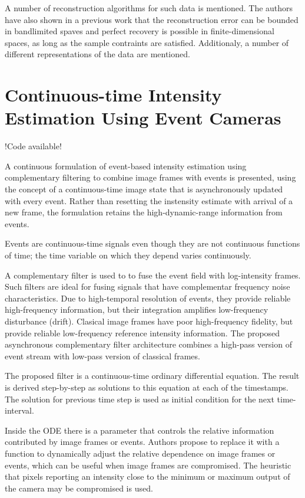\documentclass[10pt,a4paper]{article}
\begin{document}
A number of reconstruction algorithms for such data is mentioned.
The authors have also shown in a previous work that the reconstruction error can be bounded in bandlimited spaves and perfect recovery is possible in finite-dimensional spaces, as long as the sample contraints are satisfied.
Additionaly, a number of different representations of the data are mentioned.

\section{Continuous-time Intensity Estimation Using Event Cameras}
!Code available!

A continuous formulation of event-based intensity estimation using complementary filtering to combine image frames with events is presented, using the concept of a continuous-time image state that is asynchronously updated with every event.
Rather than resetting the instensity estimate with arrival of a new frame, the formulation retains the high-dynamic-range information from events.

Events are continuous-time signals even though they are not continuous functions of time; the time variable on which they depend varies continuously.

A complementary filter is used to to fuse the event field with log-intensity frames. 
Such filters are ideal for fusing signals that have complementar frequency noise characteristics.
Due to high-temporal resolution of events, they provide reliable high-frequency information, but their integration amplifies low-frequency disturbance (drift).
Clasical image frames have poor high-frequency fidelity, but provide reliable low-frequency reference intensity information.
The proposed asynchronous complementary filter architecture combines a high-pass version of event stream with low-pass version of classical frames.

The proposed filter is a continuous-time ordinary differential equation. The result is derived step-by-step as solutions to this equation at each of the timestamps. 
The solution for previous time step is used as initial condition for the next time-interval.

Inside the ODE there is a parameter that controls the relative information contributed by image frames or events. 
Authors propose to replace it with a function to dynamically adjust the relative dependence on image frames or events, which can be useful when image frames are compromised.
The heuristic that pixels reporting an intensity close to the minimum or maximum output of the camera may be compromised is used.
\end{document}
